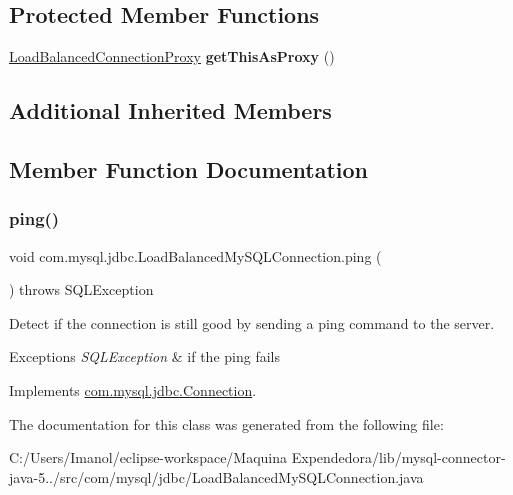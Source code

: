 \subsection*{Protected Member Functions}
\begin{DoxyCompactItemize}
\item 
\mbox{\label{classcom_1_1mysql_1_1jdbc_1_1_load_balanced_my_s_q_l_connection_ae1f512fbdd01d9a28aee62774bcb3b8d}} 
\mbox{\hyperlink{classcom_1_1mysql_1_1jdbc_1_1_load_balanced_connection_proxy}{Load\+Balanced\+Connection\+Proxy}} {\bfseries get\+This\+As\+Proxy} ()
\end{DoxyCompactItemize}
\subsection*{Additional Inherited Members}


\subsection{Member Function Documentation}
\mbox{\label{classcom_1_1mysql_1_1jdbc_1_1_load_balanced_my_s_q_l_connection_aa99b15e6981c678122ccce3aaf68e32c}} 
\subsubsection{\texorpdfstring{ping()}{ping()}}
{\footnotesize\ttfamily void com.\+mysql.\+jdbc.\+Load\+Balanced\+My\+S\+Q\+L\+Connection.\+ping (\begin{DoxyParamCaption}{ }\end{DoxyParamCaption}) throws S\+Q\+L\+Exception}

Detect if the connection is still good by sending a ping command to the server.


\begin{DoxyExceptions}{Exceptions}
{\em S\+Q\+L\+Exception} & if the ping fails \\
\hline
\end{DoxyExceptions}


Implements \mbox{\hyperlink{interfacecom_1_1mysql_1_1jdbc_1_1_connection_a65a9bf75714ed318b0324f99dfa09761}{com.\+mysql.\+jdbc.\+Connection}}.



The documentation for this class was generated from the following file\+:\begin{DoxyCompactItemize}
\item 
C\+:/\+Users/\+Imanol/eclipse-\/workspace/\+Maquina Expendedora/lib/mysql-\/connector-\/java-\/5../src/com/mysql/jdbc/Load\+Balanced\+My\+S\+Q\+L\+Connection.\+java\end{DoxyCompactItemize}
